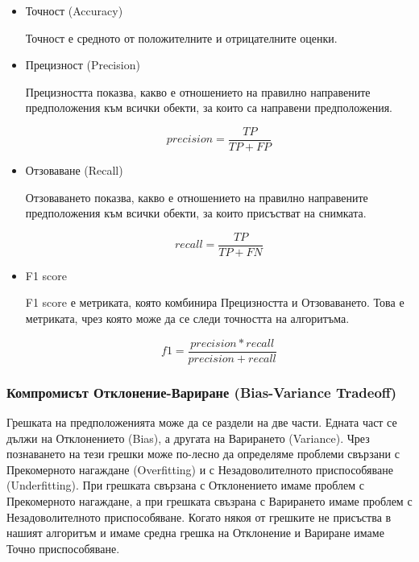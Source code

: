 \documentclass{article}
\begin{document}
    \begin{itemize}

        \item Точност (Accuracy)

        Точност е средното от положителните и отрицателните оценки.

        \item Прецизност (Precision)

        Прецизността показва, какво е отношението на правилно направените предположения към всички обекти, за които са
        направени предположения.

        \begin{equation}
            precision = \frac{TP}{TP + FP}
        \end{equation}

        \item Отзоваване (Recall)

        Отзоваването показва, какво е отношението на правилно направените предположения към всички обекти, за които
        присъстват на снимката.

        \begin{equation}
            recall = \frac{TP}{TP + FN}
        \end{equation}

        \item F1 score

        F1 score е метриката, която комбинира Прецизността и Отзоваването. Това е метриката, чрез която може да се следи
        точността на алгоритъма. \cite{metrics}

        \begin{equation}
            f1 = \frac{precision * recall}{precision + recall}
        \end{equation}

    \end{itemize}

    \subsubsection{Компромисът Отклонение-Вариране (Bias-Variance Tradeoff)}

    Грешката на предположенията може да се раздели на две части. Едната част се дължи на Отклонението (Bias), а другата на
    Варирането (Variance). Чрез познаването на тези грешки може по-лесно да определяме проблеми свързани с Прекомерното
    нагаждане (Overfitting) и с Незадоволителното приспособяване (Underfitting). При грешката свързана с Отклонението имаме
    проблем с Прекомерното нагаждане, а при грешката свъзрана с Варирането имаме проблем с Незадоволителното
    приспособяване. Когато някоя от грешките не присъства в нашият алгоритъм и имаме средна грешка на Отклонение и Вариране
    имаме Точно приспособяване. \cite{bias-variance}
\end{document}
